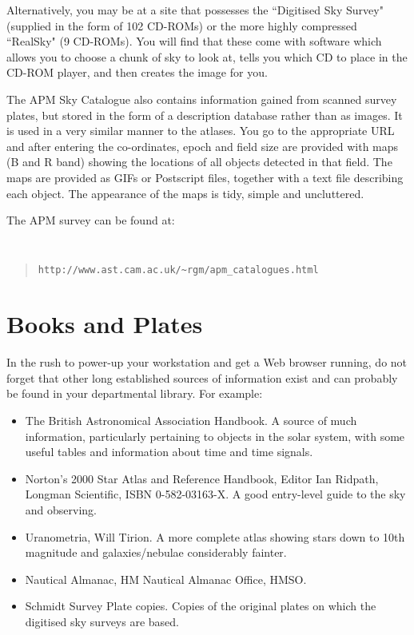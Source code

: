 \documentclass[twoside,11pt]{article}
\newcommand{\htmladdnormallink}[2]{#1}
\newcommand{\xlabel}[1]{}
\newcommand{\APMref}{\htmladdnormallink{APM}{\tt http://www.ast.cam.ac.uk/\~{}rgm/apm_catalogues.html}}
\begin{document}
Alternatively, you may be at a site that possesses the ``Digitised 
Sky Survey" (supplied in the form of 102 CD-ROMs) or the more highly compressed
``RealSky" (9 CD-ROMs). You will find that these come with software which
allows you to choose a chunk of sky to look at, tells you which CD to place in 
the CD-ROM player, and then creates the image for you.

The {\APMref} Sky Catalogue also contains information gained from scanned survey plates, but
stored in the form of a description database rather than as images. It is used in a very similar manner to the atlases.
You go to the appropriate URL and after entering the co-ordinates, epoch and field size
are provided with maps (B and R band) showing the locations of all objects detected in that field.
The maps are provided as GIFs or Postscript files, together with a text file describing each object.
The appearance of the maps is tidy, simple and uncluttered.

The APM survey can be found at:

{\tt
\begin{quote}
\begin{verbatim}
http://www.ast.cam.ac.uk/~rgm/apm_catalogues.html
\end{verbatim}
\end{quote}
}

\section{Books and Plates} \xlabel{BOOKS}
\label{sec:books}

In the rush to power-up your workstation and get a Web browser
running, do not forget that other long established sources of information
exist and can probably be found in your departmental library. 
For example:

\begin{itemize}
\item The British Astronomical Association Handbook.
A source of much information,
particularly pertaining to objects in the solar system, with some useful tables and
information about time and time signals.
\item Norton's 2000 Star Atlas and Reference Handbook, Editor Ian Ridpath, Longman Scientific,
ISBN 0-582-03163-X. A good entry-level guide to the sky and observing. 
\item Uranometria, Will Tirion. A more complete atlas showing stars down to 10th
magnitude and galaxies/nebulae considerably fainter.
\item Nautical Almanac, HM Nautical Almanac Office, HMSO.
\item Schmidt Survey Plate copies. Copies of the original plates on which
the digitised sky surveys are based.
\end{itemize}
\end{document}
